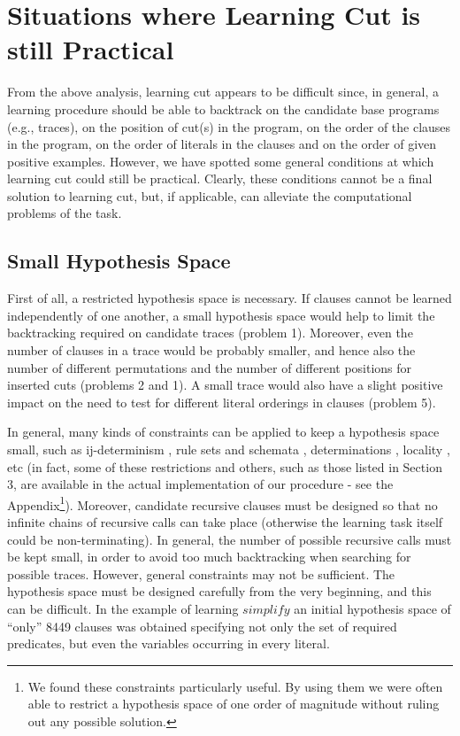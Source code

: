 \section{Situations where Learning Cut is still Practical}
 
From the above analysis, learning cut appears to be difficult since,
in general, a learning procedure should be able to backtrack on the
candidate base programs (e.g., traces), on the position of cut(s) in
the program, on the order of the clauses in the program, on the
order of literals in the clauses and on the order
of given positive examples. However,
we have spotted some general conditions at which learning 
cut could still be 
practical. Clearly, these conditions cannot be a final solution to 
learning cut, but, if applicable, can alleviate the computational problems
of the task.
 
\subsection{Small Hypothesis Space}
First of all, a restricted hypothesis space is necessary. If clauses
cannot be learned independently of one another, a small hypothesis
space would help to limit the backtracking required on candidate
traces (problem 1). Moreover, even the number of clauses
in a trace would be probably 
smaller, and hence also the number of different
permutations and the number of
different positions for inserted cuts (problems 2 and 1).
A small trace would also have a slight positive impact on the need
to test for different literal orderings in clauses (problem 5).
 
In general, many kinds of constraints can be applied to keep a
hypothesis space small,
such as
ij-determinism \cite{muggaltc90}, 
rule sets and schemata \cite{wrobilpw91,bergijca93}, determinations
\cite{russaaai88}, locality \cite{coheijcw93}, etc (in fact,
some of these restrictions and others, such as those listed in 
Section 3,
are available in the actual implementation of our procedure -
see the Appendix\footnote{We found these constraints particularly useful.
By using them we were often able to restrict a hypothesis space of 
one order of magnitude without ruling out any possible solution.}). 
Moreover, candidate recursive clauses must be 
designed so that no
infinite chains of recursive calls can take place \cite{bergijca93}
(otherwise the learning task itself could be non-terminating).
In general, the number of possible recursive calls must
be kept small, in order to avoid too much backtracking
when searching for possible traces.
However, general constraints may not be sufficient. 
The hypothesis space must be designed carefully from the very 
beginning, and this can be difficult.
In the example of learning $simplify$ an initial hypothesis space 
of ``only'' 8449 clauses was obtained specifying not only the set
of required predicates, but even the variables occurring in every literal.
 
